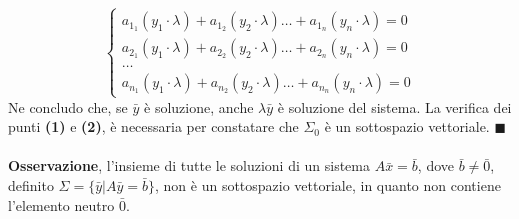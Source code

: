 \documentclass[12pt, letterpaper]{article}
\newcommand{\acc}{\\\hphantom{}\\}
\begin{document}
\begin{equation}
    \begin{cases}
        a_{1_1}(y_1\cdot \lambda)+a_{1_2}(y_2\cdot \lambda)\dots+a_{1_n}(y_n\cdot \lambda)=0\\
        a_{2_1}(y_1\cdot \lambda)+a_{2_2}(y_2\cdot \lambda)\dots+a_{2_n}(y_n\cdot \lambda)=0\\\dots\\ 
        a_{n_1}(y_1\cdot \lambda)+a_{n_2}(y_2\cdot \lambda)\dots+a_{n_n}(y_n\cdot \lambda)=0
    \end{cases}
\end{equation}
Ne concludo che, se \(\bar y\) è soluzione, anche \(\lambda \bar y\) è soluzione del sistema. La verifica 
dei punti \textbf{(1)} e \textbf{(2)}, è necessaria per constatare che \(\Sigma_0\) è un sottospazio vettoriale. \(\blacksquare\)
\acc \textbf{Osservazione}, l'insieme di tutte le soluzioni di un sistema \(A\bar x = \bar b\), dove 
\(\bar b \ne \bar 0\), definito \(\Sigma = \{\bar y | A\bar y = \bar b\}\), non è un sottospazio vettoriale, in 
quanto non contiene l'elemento neutro \(\bar 0\).
\end{document}
